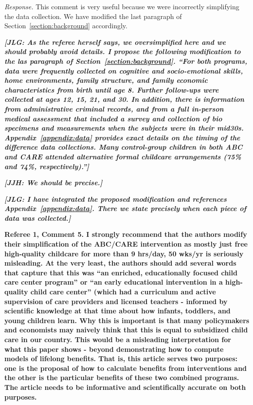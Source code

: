 \noindent \textit{Response.} This comment is very useful because we were incorrectly simplifying the data collection. We have modified the last paragraph of Section~\ref{section:background} accordingly.

\textit{\textbf{[JLG: As the referee herself says, we oversimplified here and we should probably avoid details. I propose the following modification to the las paragraph of Section~\ref{section:background}. ``For both programs, data were frequently collected on cognitive and socio-emotional skills, home environments, family structure, and family economic characteristics from birth until age 8. Further follow-ups were collected at ages 12, 15, 21, and 30. In addition, there is information from administrative criminal records, and from a full in-person medical assessment that included a survey and collection of bio specimens and measurements when the subjects were in their mid30s. Appendix~\ref{appendix:data} provides exact details on the timing of the difference data collections. Many control-group children in both ABC and CARE attended alternative formal childcare arrangements (75\% and 74\%, respectively).'']}} 

\textit{\textbf{[JJH: We should be precise.]}}

\textit{\textbf{[JLG: I have integrated the proposed modification and references Appendix~\ref{appendix:data}. There we state precisely when each piece of data was collected.]}}

\noindent \textbf{Referee 1, Comment 5. I strongly recommend that the authors modify their simplification of the ABC/CARE intervention as mostly just free high-quality childcare for more than 9 hrs/day, 50 wks/yr is seriously misleading. At the very least, the authors should add several words that capture that this was ``an enriched, educationally focused child care center program'' or ``an early educational intervention in a high-quality child care center'' (which had a curriculum and active supervision of care providers and licensed teachers - informed by scientific knowledge at that time about how infants, toddlers, and young children learn. Why this is important is that many policymakers and economists may naively think that this is equal to subsidized child care in our country. This would be a misleading interpretation for what this paper shows - beyond demonstrating how to compute models of lifelong benefits. That is, this article serves two purposes: one is the proposal of how to calculate benefits from interventions and the other is the particular benefits of these two combined programs. The article needs to be informative and scientifically accurate on both purposes.}

